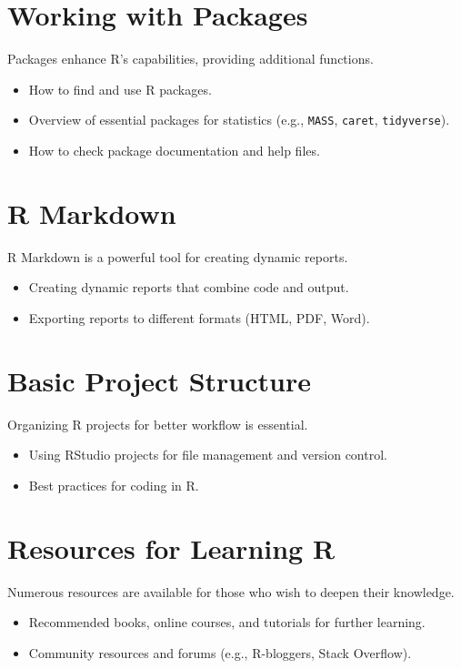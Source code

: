 \documentclass[12pt]{book}
\begin{document}
\section{Working with Packages}
Packages enhance R's capabilities, providing additional functions.
\begin{itemize}
    \item How to find and use R packages.
    \item Overview of essential packages for statistics (e.g., \texttt{MASS}, \texttt{caret}, \texttt{tidyverse}).
    \item How to check package documentation and help files.
\end{itemize}

\section{R Markdown}
R Markdown is a powerful tool for creating dynamic reports.
\begin{itemize}
    \item Creating dynamic reports that combine code and output.
    \item Exporting reports to different formats (HTML, PDF, Word).
\end{itemize}

\section{Basic Project Structure}
Organizing R projects for better workflow is essential.
\begin{itemize}
    \item Using RStudio projects for file management and version control.
    \item Best practices for coding in R.
\end{itemize}

\section{Resources for Learning R}
Numerous resources are available for those who wish to deepen their knowledge.
\begin{itemize}
    \item Recommended books, online courses, and tutorials for further learning.
    \item Community resources and forums (e.g., R-bloggers, Stack Overflow).
\end{itemize}
\end{document}
